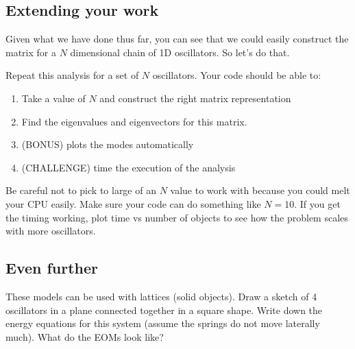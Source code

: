 \subsection{Extending your work}\label{extending-your-work}

Given what we have done thus far, you can see that we could easily
construct the matrix for a \(N\) dimensional chain of 1D oscillators. So
let's do that.

Repeat this analysis for a set of \(N\) oscillators. Your code should be
able to:

\begin{enumerate}
\def\labelenumi{\arabic{enumi}.}
\tightlist
\item
  Take a value of \(N\) and construct the right matrix representation
\item
  Find the eigenvalues and eigenvectors for this matrix.
\item
  (BONUS) plots the modes automatically
\item
  (CHALLENGE) time the execution of the analysis
\end{enumerate}

Be careful not to pick to large of an \(N\) value to work with because
you could melt your CPU easily. Make sure your code can do something
like \(N=10\). If you get the timing working, plot time vs number of
objects to see how the problem scales with more oscillators.

\begin{Shaded}
\begin{Highlighting}[]
\end{Highlighting}
\end{Shaded}

\subsection{Even further}\label{even-further}

These models can be used with lattices (solid objects). Draw a sketch of
4 oscillators in a plane connected together in a square shape. Write
down the energy equations for this system (assume the springs do not
move laterally much). What do the EOMs look like?
